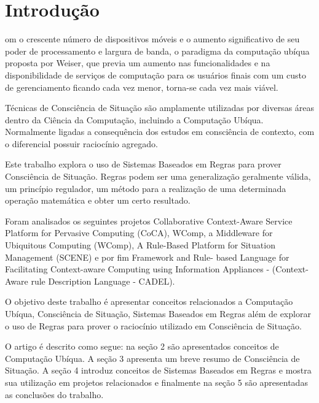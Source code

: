 \documentclass[12pt,a4paper,compsoc]{IEEEtran}
\begin{document}
\maketitle

\section{Introduç\~ao}
  om o crescente número de dispositivos móveis e o aumento significativo de seu
  poder de processamento e largura de banda, o paradigma da computação ubíqua proposta por Weiser,
  que previa um aumento nas funcionalidades e na disponibilidade de serviços de computação para os
  usuários finais com um custo de gerenciamento ficando cada vez menor, torna-se cada vez mais
  viável.
  
  Técnicas de Consciência de Situação são amplamente utilizadas por diversas áreas dentro da
  Ciência da Computação, incluindo a Computação Ubíqua. Normalmente ligadas a consequência dos
  estudos em consciência de contexto, com o diferencial possuir raciocínio agregado.
  
  Este trabalho explora o uso de Sistemas Baseados em Regras para prover Consciência de Situação.
  Regras podem ser uma generalização geralmente válida, um princípio regulador, um método para a
  realização de uma determinada operação matemática e obter um certo resultado.
  
  Foram analisados os seguintes projetos Collaborative Context-Aware Service Platform for Pervasive
  Computing (CoCA), WComp, a Middleware for Ubiquitous Computing (WComp), A Rule-Based Platform for
  Situation Management (SCENE) e por fim Framework and Rule- based Language for Facilitating 
  Context-aware Computing using Information Appliances - (Context-Aware rule Description Language -
  CADEL).
  
  O objetivo deste trabalho é apresentar conceitos relacionados a Computação Ubíqua, Consciência de
  Situação, Sistemas Baseados em Regras além de explorar o uso de Regras para prover o raciocínio
  utilizado em Consciência de Situação.
  
  O artigo é descrito como segue: na seção 2 são apresentados conceitos de Computação Ubíqua. A
  seção 3 apresenta um breve resumo de Consciência de Situação. A seção 4 introduz conceitos de
  Sistemas Baseados em Regras e mostra sua utilização em projetos relacionados e finalmente na
  seção 5 são apresentadas as conclusões do trabalho.
\end{document}
